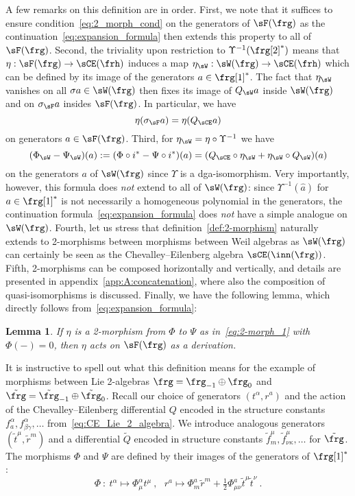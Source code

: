\documentclass[reqno,a4paper,11pt]{article}
\newtheorem{lemma}[thm]{Lemma}
\begin{document}
A few remarks on this definition are in order. First, we note that it suffices to ensure condition~\eqref{eq:2_morph_cond} on the generators of $\sF(\frg)$ as the continuation~\eqref{eq:expansion_formula} then extends this property to all of $\sF(\frg)$. Second, the triviality upon restriction to $\Upsilon^{-1}(\frg[2]^*)$ means that $\eta: \sF(\frg)\to \sCE(\frh)$ induces a map $\eta_\sW:\sW(\frg)\to \sCE(\frh)$ which can be defined by its image of the generators $a\in \frg[1]^*$. The fact that $\eta_\sW$ vanishes on all $\sigma a \in \sW(\frg)$ then fixes its image of $Q_\sW a$ inside $\sW(\frg)$ and on $\sigma_\sF a$ insides $\sF(\frg)$. In particular, we have
\begin{equation}\label{eq:restiction_eta}
 \eta(\sigma_\sF a)=\eta(Q_\sCE a)
\end{equation}
on generators $a\in \sF(\frg)$. Third, for $\eta_\sW=\eta\circ \Upsilon^{-1}$ we have
\begin{equation}
(\Phi_\sW-\Psi_\sW)(a):=(\Phi\circ i^*-\Psi\circ i^*)(a)=(Q_\sCE\circ\eta_\sW+\eta_\sW\circ Q_\sW)(a)
\end{equation}
on the generators $a$ of $\sW(\frg)$ since $\Upsilon$ is a dga-isomorphism. Very importantly, however, this formula does {\em not} extend to all of $\sW(\frg)$: since $\Upsilon^{-1}(\hat a)$ for $a\in\frg[1]^*$ is not necessarily a homogeneous polynomial in the generators, the continuation formula~\eqref{eq:expansion_formula} does {\em not} have a simple analogue on $\sW(\frg)$. Fourth, let us stress that definition~\ref{def:2-morphism} naturally extends to 2-morphisms between morphisms between Weil algebras as $\sW(\frg)$ can certainly be seen as the Chevalley--Eilenberg algebra $\sCE(\inn(\frg))$. Fifth, 2-morphisms can be composed horizontally and vertically, and details are presented in appendix~\ref{app:A:concatenation}, where also the composition of quasi-isomorphisms is discussed. Finally, we have the following lemma, which directly follows from~\eqref{eq:expansion_formula}:
\begin{lemma}\label{lem:eta_as_derivation}
 If $\eta$ is a 2-morphism from $\Phi$ to $\Psi$ as in~\eqref{eq:2-morph_1} with $\Phi(-)=0$, then $\eta$ acts on $\sF(\frg)$ as a derivation.
\end{lemma}

It is instructive to spell out what this definition means for the example of morphisms between Lie 2-algebras $\frg=\frg_{-1}\oplus \frg_0$ and $\tilde \frg=\tilde \frg_{-1}\oplus \tilde \frg_0$. Recall our choice of generators $(t^\alpha,r^a)$ and the action of the Chevalley--Eilenberg differential $Q$ encoded in the structure constants $f^\alpha_a, f^\alpha_{\beta\gamma}, \dots$ from~\eqref{eq:CE_Lie_2_algebra}. We introduce analogous generators $(\tilde t^\mu,\tilde r^m)$ and a differential $\tilde Q$ encoded in structure constants $\tilde f^\mu_m, \tilde f^\mu_{\nu\kappa}, \dots$ for $\tilde \frg$. The morphisms $\Phi$ and $\Psi$ are defined by their images of the generators of $\frg[1]^*$:
\begin{equation}
 \Phi~:~t^\alpha\mapsto \Phi^\alpha_\mu t^\mu~,~~~r^a\mapsto\Phi^a_m\tilde r^m+\tfrac12 \Phi^a_{\mu\nu}\tilde t^\mu\tilde t^\nu~.
\end{equation}
\end{document}
